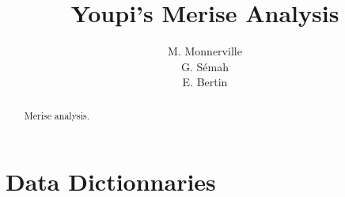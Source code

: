 \documentclass[twoside,a4paper]{article}
\begin{document}
\title{{\sc Youpi}'s Merise Analysis}
\author{M. Monnerville\\G. S\'emah\\E. Bertin}

\maketitle

\begin{abstract}
Merise analysis.
\end{abstract}

\listoftables
\listoffigures
\newpage

\section{Data Dictionnaries}

\end{document}
